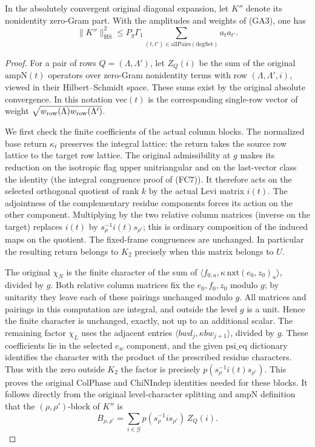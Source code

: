 \begin{lemma}
\label{lem:flag-finite-norm-expansion}
In the absolutely convergent original diagonal expansion, let
\(K''\) denote its nonidentity zero-Gram part. With the
amplitudes and weights of (GA3), one has
\[
 \|K''\|_{\mathrm{HS}}^2
 \le P_g\Gamma_1\!
  \sum_{(t,t')\in\mathrm{allPairs}(\mathrm{degSet})}a_ta_{t'} .
 \tag{FL5}
\]
\end{lemma}
\begin{proof}
For a pair of rows \(Q=(\Lambda,\Lambda')\), let
\(Z_Q(i)\) be the sum of the original \(\mathrm{ampN}(t)\)
operators over zero-Gram nonidentity terms with row
\((\Lambda,\Lambda',i)\), viewed in their Hilbert--Schmidt
space. These sums exist by the original absolute convergence.
In this notation \(\mathrm{vec}(t)\) is the corresponding
single-row vector of weight
\(\sqrt{w_{\rm row}(\Lambda)w_{\rm row}(\Lambda')}\).

We first check the finite coefficients of the actual column
blocks. The normalized base return \(\kappa_t\) preserves the
integral lattice: the return takes the source row lattice to
the target row lattice. The original admissibility at \(g\)
makes its reduction on the isotropic flag upper unitriangular
and on the last-vector class the identity (the integral
congruence proof of (FC7)). It therefore acts on the selected
orthogonal quotient of rank \(k\) by the actual Levi
matrix \(i(t)\). The adjointness of the complementary
residue components forces its action on the other component.
Multiplying by the two relative column matrices (inverse on
the target) replaces \(i(t)\) by
\(s_\rho^{-1}i(t)s_{\rho'}\); this is ordinary composition
of the induced maps on the quotient. The fixed-frame
congruences are unchanged. In particular the resulting
return belongs to \(K_2\) precisely when this matrix
belongs to \(U\).

The original \(\chi_N\) is the finite character of the
sum of \(\langle f_{0,a},\kappa\,\mathrm{nxt}(e_0,z_0)_a\rangle\),
divided by \(g\). Both relative column matrices fix the
\(e_0,f_0,z_0\) modulo \(g\); by unitarity they leave
each of these pairings unchanged modulo \(g\). All matrices
and pairings in this computation are integral, and outside
the level \(g\) is a unit. Hence the finite character is
unchanged, exactly, not up to an additional scalar.
The remaining factor \(\chi_L\) uses the adjacent entries
\(\langle bwd_j,\kappa bw_{j+1}\rangle\), divided by \(g\).
These coefficients lie in the selected \(e_w\) component,
and the given \(\mathrm{psi\_eq}\) dictionary identifies the
character with the product of the prescribed residue
characters. Thus with the zero outside \(K_2\) the factor
is precisely \(p(s_\rho^{-1}i(t)s_{\rho'})\).
This proves the original \(\mathrm{ColPhase}\) and
\(\mathrm{ChiNIndep}\) identities needed for these blocks.
It follows directly from the original level-character
splitting and \(\mathrm{ampN}\) definition that the
\((\rho,\rho')\)-block of \(K''\) is
\[
 B_{\rho,\rho'}=\sum_{i\in\mathcal G}
               p(s_\rho^{-1}i s_{\rho'})\,Z_Q(i).
 \tag{FL6}
\]


\end{proof}

